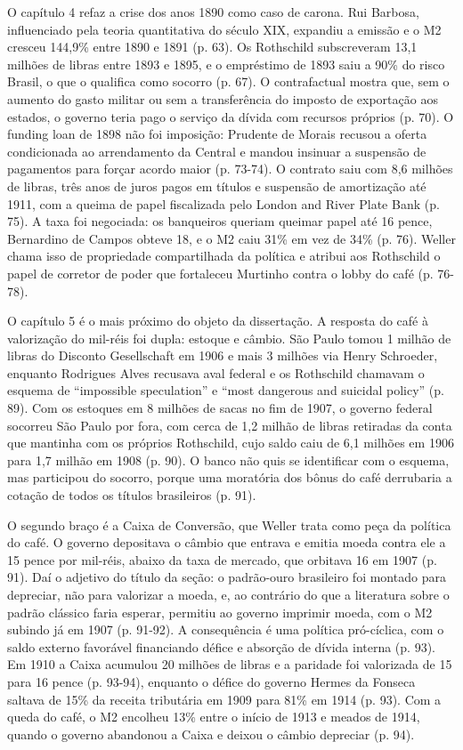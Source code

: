 O capítulo 4 refaz a crise dos anos 1890 como caso de carona. Rui Barbosa,
influenciado pela teoria quantitativa do século XIX, expandiu a emissão e o M2
cresceu 144,9\% entre 1890 e 1891 (p. 63). Os Rothschild subscreveram 13,1
milhões de libras entre 1893 e 1895, e o empréstimo de 1893 saiu a 90\% do risco
Brasil, o que o qualifica como socorro (p. 67). O contrafactual mostra que, sem o
aumento do gasto militar ou sem a transferência do imposto de exportação aos
estados, o governo teria pago o serviço da dívida com recursos próprios (p. 70).
O funding loan de 1898 não foi imposição: Prudente de Morais recusou a oferta
condicionada ao arrendamento da Central e mandou insinuar a suspensão de
pagamentos para forçar acordo maior (p. 73-74). O contrato saiu com 8,6 milhões
de libras, três anos de juros pagos em títulos e suspensão de amortização até
1911, com a queima de papel fiscalizada pelo London and River Plate Bank (p. 75).
A taxa foi negociada: os banqueiros queriam queimar papel até 16 pence,
Bernardino de Campos obteve 18, e o M2 caiu 31\% em vez de 34\% (p. 76). Weller
chama isso de propriedade compartilhada da política e atribui aos Rothschild o
papel de corretor de poder que fortaleceu Murtinho contra o lobby do café
(p. 76-78).

O capítulo 5 é o mais próximo do objeto da dissertação. A resposta do café à
valorização do mil-réis foi dupla: estoque e câmbio. São Paulo tomou 1 milhão de
libras do Disconto Gesellschaft em 1906 e mais 3 milhões via Henry Schroeder,
enquanto Rodrigues Alves recusava aval federal e os Rothschild chamavam o esquema
de ``impossible speculation'' e ``most dangerous and suicidal policy'' (p. 89).
Com os estoques em 8 milhões de sacas no fim de 1907, o governo federal socorreu
São Paulo por fora, com cerca de 1,2 milhão de libras retiradas da conta que
mantinha com os próprios Rothschild, cujo saldo caiu de 6,1 milhões em 1906 para
1,7 milhão em 1908 (p. 90). O banco não quis se identificar com o esquema, mas
participou do socorro, porque uma moratória dos bônus do café derrubaria a
cotação de todos os títulos brasileiros (p. 91).

O segundo braço é a Caixa de Conversão, que Weller trata como peça da política do
café. O governo depositava o câmbio que entrava e emitia moeda contra ele a 15
pence por mil-réis, abaixo da taxa de mercado, que orbitava 16 em 1907 (p. 91).
Daí o adjetivo do título da seção: o padrão-ouro brasileiro foi montado para
depreciar, não para valorizar a moeda, e, ao contrário do que a literatura sobre
o padrão clássico faria esperar, permitiu ao governo imprimir moeda, com o M2
subindo já em 1907 (p. 91-92). A consequência é uma política pró-cíclica, com o
saldo externo favorável financiando défice e absorção de dívida interna (p. 93).
Em 1910 a Caixa acumulou 20 milhões de libras e a paridade foi valorizada de 15
para 16 pence (p. 93-94), enquanto o défice do governo Hermes da Fonseca saltava
de 15\% da receita tributária em 1909 para 81\% em 1914 (p. 93). Com a queda do
café, o M2 encolheu 13\% entre o início de 1913 e meados de 1914, quando o
governo abandonou a Caixa e deixou o câmbio depreciar (p. 94).

